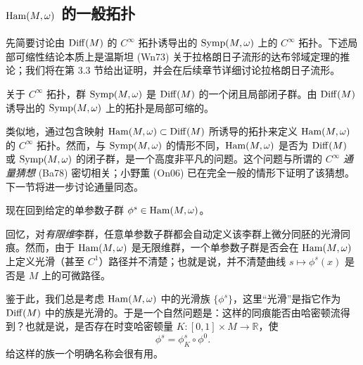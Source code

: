 \subsection{\texorpdfstring{$\operatorname{Ham}(M,\omega)$ 的一般拓扑}{Ham(M, omega) 的一般拓扑}}

先简要讨论由 $\operatorname{Diff}(M)$ 的 $C^\infty$ 拓扑诱导出的 $\operatorname{Symp}(M,\omega)$ 上的 $C^\infty$ 拓扑。下述局部可缩性结论本质上是温斯坦 (Wn73) 关于拉格朗日子流形的达布邻域定理的推论；我们将在第 3.3 节给出证明，并会在后续章节详细讨论拉格朗日子流形。

\begin{proposition}
\label{prop:symp-topology}
关于 $C^\infty$ 拓扑，群 $\operatorname{Symp}(M,\omega)$ 是 $\operatorname{Diff}(M)$ 的一个闭且局部闭子群。由 $\operatorname{Diff}(M)$ 诱导出的 $\operatorname{Symp}(M,\omega)$ 上的拓扑是局部可缩的。
\end{proposition}

类似地，通过包含映射 $\operatorname{Ham}(M,\omega)\subset\operatorname{Diff}(M)$ 所诱导的拓扑来定义 $\operatorname{Ham}(M,\omega)$ 的 $C^\infty$ 拓扑。然而，与 $\operatorname{Symp}(M,\omega)$ 的情形不同，$\operatorname{Ham}(M,\omega)$ 是否为 $\operatorname{Diff}(M)$ 或 $\operatorname{Symp}(M,\omega)$ 的闭子群，是一个高度非平凡的问题。这个问题与所谓的 $C^\infty$ \emph{通量猜想} (Ba78) 密切相关；小野薫 (On06) 已在完全一般的情形下证明了该猜想。下一节将进一步讨论通量同态。

现在回到给定的单参数子群 $\phi^s\in\operatorname{Ham}(M,\omega)$。

\begin{remark}
\label{rem:one-parameter-subgroup-smoothness}
回忆，对\emph{有限维}李群，任意单参数子群都会自动定义该李群上微分同胚的光滑同痕。然而，由于 $\operatorname{Ham}(M,\omega)$ 是无限维群，一个单参数子群是否会在 $\operatorname{Ham}(M,\omega)$ 上定义光滑（甚至 $C^1$）路径并不清楚；也就是说，并不清楚曲线 $s\mapsto\phi^s(x)$ 是否是 $M$ 上的可微路径。
\end{remark}

鉴于此，我们总是考虑 $\operatorname{Ham}(M,\omega)$ 中的光滑族 $\{\phi^s\}$，这里“光滑”是指它作为 $\operatorname{Diff}(M)$ 中的族是光滑的。于是一个自然问题是：这样的同痕能否由哈密顿流得到？也就是说，是否存在时变哈密顿量
$K:[0,1]\times M\to\mathbb R$，使
\begin{equation}
  \phi^s=\phi_K^s\circ\phi^0.
  \label{eq:2.3.23}
\end{equation}
给这样的族一个明确名称会很有用。

